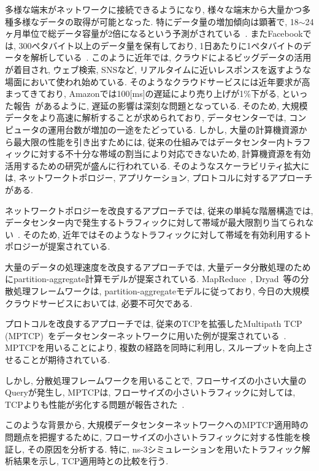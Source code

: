 \documentclass[technicalreport]{ieicej}
\begin{document}
多様な端末がネットワークに接続できるようになり, 様々な端末から大量かつ多種多様なデータの取得が可能となった.
特にデータ量の増加傾向は顕著で, 18$\sim$24ヶ月単位で総データ容量が2倍になるという予測がされている~\cite{IBM_rep}.
またFacebookでは, 300ペタバイト以上のデータ量を保有しており, 1日あたりに1ペタバイトのデータを解析している~\cite{presto}.
このように近年では, クラウドによるビッグデータの活用が着目され, ウェブ検索, SNSなど,
リアルタイムに近いレスポンスを返すような場面において使われ始めている.
そのようなクラウドサービスには近年要求が高まってきており, Amazonでは100[ms]の遅延により売り上げが1\%下がる,
といった報告~\cite{amazon}があるように, 遅延の影響は深刻な問題となっている.
そのため, 大規模データをより高速に解析することが求められており, データセンターでは,
コンピュータの運用台数が増加の一途をたどっている.
しかし, 大量の計算機資源から最大限の性能を引き出すためには, 従来の仕組みではデータセンター内トラフィックに対する不十分な帯域の割当により対応できないため,
計算機資源を有効活用するための研究が盛んに行われている.
そのようなスケーラビリティ拡大には, ネットワークトポロジー, アプリケーション, プロトコルに対するアプローチがある.

ネットワークトポロジーを改良するアプローチでは, 従来の単純な階層構造では,
データセンター内で発生するトラフィックに対して帯域が最大限割り当てられない~\cite{fattree}.
そのため, 近年ではそのようなトラフィックに対して帯域を有効利用するトポロジーが提案されている.

大量のデータの処理速度を改良するアプローチでは,
大量データ分散処理のためにpartition-aggregate計算モデルが提案されている.
MapReduce~\cite{mapreduce}, Dryad~\cite{dryad}等の分散処理フレームワークは,
partition-aggregateモデルに従っており, 今日の大規模クラウドサービスにおいては, 必要不可欠である.

プロトコルを改良するアプローチでは,
従来のTCPを拡張したMultipath TCP
(MPTCP)~\cite{mptcp}をデータセンターネットワークに用いた例が提案されている~\cite{fattree,bcube,vl2}.
MPTCPを用いることにより, 複数の経路を同時に利用し, スループットを向上させることが期待されている.

しかし, 分散処理フレームワークを用いることで, フローサイズの小さい大量のQueryが発生し, MPTCPは,
フローサイズの小さいトラフィックに対しては, TCPよりも性能が劣化する問題が報告された~\cite{improving}.

このような背景から, 大規模データセンターネットワークへのMPTCP適用時の問題点を把握するために,
フローサイズの小さいトラフィックに対する性能を検証し,
その原因を分析する.
特に, ns-3シミュレーションを用いたトラフィック解析結果を示し, TCP適用時との比較を行う.
\end{document}

